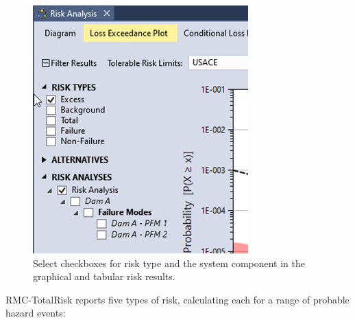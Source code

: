 \documentclass[
]{book}
\begin{document}
\begin{figure}

{\centering \includegraphics{images/figure137} 

}

\caption{Select checkboxes for risk type and the system component in the graphical and tabular risk results.}\label{fig:figure-137}
\end{figure}

RMC-TotalRisk reports five types of risk, calculating each for a range of probable hazard events:
\end{document}
